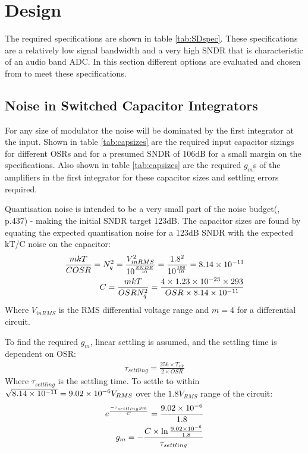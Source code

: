 \section{Design}
\label{Design}
The required specifications are shown in table \ref{tab:SDspec}.
These specifications are a relatively low signal bandwidth and a very high SNDR that is characteristic of an audio band ADC.
In this section different options are evaluated and chosen from to meet these specifications.



\subsection{Noise in  Switched Capacitor Integrators}
\label{Design:noise}
For any size of modulator the noise will be dominated by the first integrator at the input\cite{Henderson2013}.
Shown in table \ref{tab:capsizes} are the required input capacitor sizings for different OSRs and for a presumed SNDR of 106dB for a small margin on the specifications.
Also shown in table \ref{tab:capsizes} are the required $g_{m}$s of the amplifiers in the first integrator for these capacitor sizes and settling errors required.

Quantisation noise is intended to be a very small part of the noise budget(\cite{Steensgaard2004}, p.437) - making the initial SNDR target 123dB.
The capacitor sizes are found by equating the expected quantisation noise for a 123dB SNDR with the expected kT/C noise on the capacitor:
\begin{align}
    \frac{m k T}{C OSR} = N_{q}^{2} = \frac{V_{inRMS}^{2}}{10^{\frac{SNDR}{10}}} = \frac{1.8^{2}}{10^{\frac{106}{10}}} = 8.14\times 10^{-11} \\
    C = \frac{m k T}{OSR N_{q}^{2}} = \frac{4 \times 1.23\times 10^{-23} \times 293}{OSR \times 8.14\times 10^{-11}} 
\end{align}
Where $V_{inRMS}$ is the RMS differential voltage range and $m=4$ for a differential circuit.

To find the required $g_{m}$, linear settling is assumed, and the settling time is dependent on OSR:
\begin{align}
    \tau_{settling} = \frac{256\times T_{clk}}{2\times OSR}
\end{align}
Where $\tau_{settling}$ is the settling time.
To settle to within $\sqrt{8.14\times 10^{-11}} = 9.02\times 10^{-6} V_{RMS}$ over the $1.8 V_{RMS}$ range of the circuit:
\begin{align}
    e^{\frac{-\tau_{settling} g_{m}}{C}} = \frac{9.02\times 10^{-6}}{1.8} \\
    g_{m}  = - \frac{C \times \ln{\frac{9.02\ensuremath{\times 10^{-6}}}{1.8}}}{\tau_{settling}}
\end{align}

